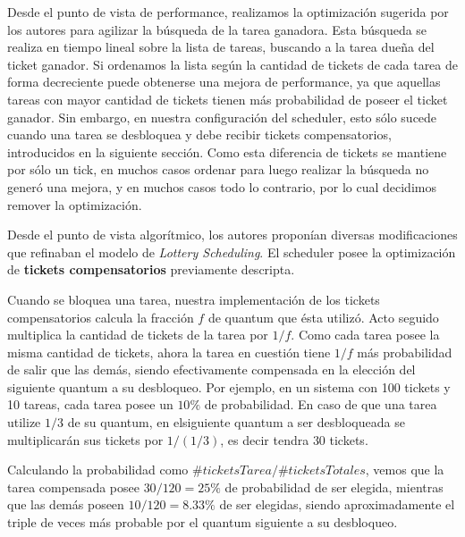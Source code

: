 Desde el punto de vista de performance, realizamos la optimizaci\'on sugerida por los autores para agilizar la b\'usqueda de la tarea ganadora. Esta b\'usqueda se realiza en tiempo lineal sobre la lista de tareas, buscando a la tarea due\~na del ticket ganador. Si ordenamos la lista seg\'un la cantidad de tickets de cada tarea de forma decreciente puede obtenerse una mejora de performance, ya que aquellas tareas con mayor cantidad de tickets tienen m\'as probabilidad de poseer el ticket ganador. Sin embargo, en nuestra configuraci\'on del scheduler, esto s\'olo sucede cuando una tarea se desbloquea y debe recibir tickets compensatorios, introducidos en la siguiente secci\'on. Como esta diferencia de tickets se mantiene por s\'olo un tick, en muchos casos ordenar para luego realizar la b\'usqueda no gener\'o una mejora, y en muchos casos todo lo contrario, por lo cual decidimos remover la optimizaci\'on.

\vspace{2mm}

Desde el punto de vista algor\'itmico, los autores propon\'ian diversas modificaciones que refinaban el modelo de \textit{Lottery Scheduling}. El scheduler posee la optimizaci\'on de \textbf{tickets compensatorios} previamente descripta.

\vspace{2mm}

Cuando se bloquea una tarea, nuestra implementaci\'on de los tickets compensatorios calcula la fracci\'on $f$ de quantum que \'esta utiliz\'o. Acto seguido multiplica la cantidad de tickets de la tarea por $1/f$. Como cada tarea posee la misma cantidad de tickets, ahora la tarea en cuesti\'on tiene $1/f$ m\'as probabilidad de salir que las dem\'as, siendo efectivamente compensada en la elecci\'on del siguiente quantum a su desbloqueo. Por ejemplo, en un sistema con 100 tickets y 10 tareas, cada tarea posee un $10\%$ de probabilidad. En caso de que una tarea utilize $1/3$ de su quantum, en elsiguiente quantum a ser desbloqueada se multiplicar\'an sus tickets por $1/(1/3)$, es decir tendra $30$ tickets.

\vspace{2mm}

Calculando la probabilidad como $\#ticketsTarea/\#ticketsTotales$, vemos que la tarea compensada posee $30/120 = 25\%$ de probabilidad de ser elegida, mientras que las dem\'as poseen $10/120 = 8.33\%$ de ser elegidas, siendo aproximadamente el triple de veces m\'as probable por el quantum siguiente a su desbloqueo.

